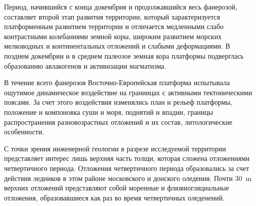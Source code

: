 Период, начившийся с конца докембрия и продолжавшийся весь фанерозой, 
составляет второй этап развития 
территории, который характеризуется платформенным развитием территории и отличается 
медленными слабо контрастными колебаниями земной коры, широким развитием морских
мелководных и континентальных отложений и слабыми деформациями. 
В позднем докембрии и в среднем палеозое земная кора платформы подверглась образованию авлакогенов 
и активизации магматизма. 

В течение всего фанерозоя Восточно-Европейская платформа испытывала 
ощутимое динамическое воздействие на граниицах с активными тектоническими
поясами.
За счет этого воздействия изменялись план и рельеф платформы, 
положение и компоновка суши и моря, поднятий и впадин, границы распространения 
разновозрастных отложений и их состав, литологические особенности.

С точки зрения инженерной геологии в разрезе исследуемой территории 
представляет интерес лишь верхняя часть толщи, которая сложена 
отложениями четвертичного периода.
Отложения четвертичного периода 
образовались за счет действия ледников в этом районе 
московского и донского оледения. 
Почти 30~\si{\meter} верхних 
отложений представляют собой моренные и флювиогляциальные отложения, 
образовавшиеся как раз  во время четвертичных оледенений.